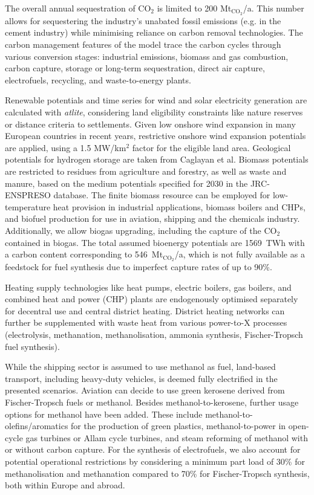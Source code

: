The overall annual sequestration of CO$_2$ is limited to 200
Mt$_{\text{CO}_2}$/a. This number allows for sequestering the industry's
unabated fossil emissions (e.g. in the cement industry) while minimising
reliance on carbon removal technologies. The carbon management features of the
model trace the carbon cycles through various conversion stages: industrial
emissions, biomass and gas combustion, carbon capture, storage or long-term
sequestration, direct air capture, electrofuels, recycling, and waste-to-energy
plants.

Renewable potentials and time series for wind and solar electricity generation
are calculated with \textit{atlite},\cite{hofmannAtliteLightweight2021}
considering land eligibility constraints like nature reserves or distance
criteria to settlements. Given low onshore wind expansion in many European
countries in recent years,\cite{ourworldindataInstalledWind2023} restrictive
onshore wind expansion potentials are applied, using a 1.5 MW/km$^2$ factor for
the eligible land area. Geological potentials for hydrogen storage are taken
from Caglayan et al.\cite{caglayanTechnicalPotential2020} Biomass potentials are
restricted to residues from agriculture and forestry, as well as waste and
manure, based on the medium potentials specified for 2030 in the JRC-ENSPRESO
database.\cite{ruizENSPRESOOpen2019} The finite biomass resource can be employed
for low-temperature heat provision in industrial applications, biomass boilers
and CHPs, and biofuel production for use in aviation, shipping and the chemicals
industry. Additionally, we allow biogas upgrading, including the capture of the
CO$_2$ contained in biogas. The total assumed bioenergy potentials are 1569~TWh
with a carbon content corresponding to 546~Mt$_{\text{CO}_2}$/a, which is not
fully available as a feedstock for fuel synthesis due to imperfect capture
rates of up to 90\%.

Heating supply technologies like heat pumps, electric boilers, gas boilers, and
combined heat and power (CHP) plants are endogenously optimised separately for
decentral use and central district heating. District heating networks can
further be supplemented with waste heat from various power-to-X processes
(electrolysis, methanation, methanolisation, ammonia synthesis, Fischer-Tropsch
fuel synthesis).

While the shipping sector is assumed to use methanol as fuel, land-based
transport, including heavy-duty vehicles, is deemed fully electrified in the
presented scenarios. Aviation can decide to use green kerosene derived from
Fischer-Tropsch fuels or methanol. Besides methanol-to-kerosene, further
usage options for methanol have been added.
These include
methanol-to-olefins/aromatics for the production of green plastics,
methanol-to-power\cite{brownUltralongdurationEnergyStorage2023} in open-cycle gas
turbines or Allam cycle turbines, and steam reforming of methanol with or
without carbon capture. For the synthesis of electrofuels, we also account for
potential operational restrictions by considering a minimum part load of 30\%
for methanolisation and methanation compared to 70\% for Fischer-Tropsch
synthesis, both within Europe and abroad.

